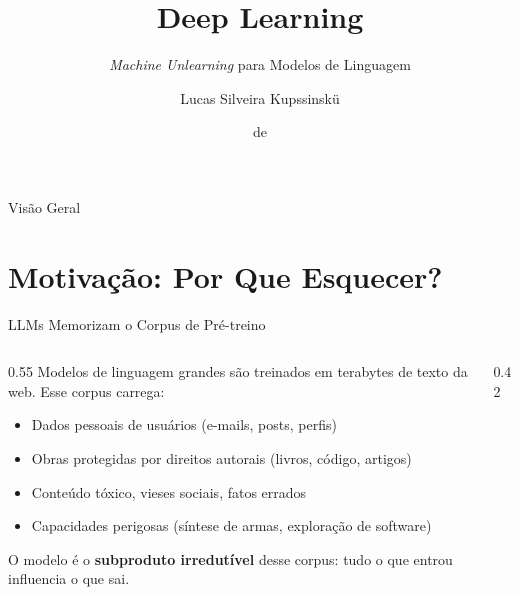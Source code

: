 \documentclass[aspectratio=169,xcolor=dvipsnames]{beamer}
\title{Deep Learning}
\subtitle{\textit{Machine Unlearning} para Modelos de Linguagem}
\author{Lucas Silveira Kupssinskü}
\institute
{
    Machine Learning Theory and Applications Laboratory \\
    PUCRS
}
\date{\mespor de \the\year}
\begin{document}
  \begin{frame}
    \titlepage
  \end{frame}

  \begin{frame}{Visão Geral}
    \tableofcontents
  \end{frame}

  \section{Motivação: Por Que Esquecer?}

  \begin{frame}{LLMs Memorizam o Corpus de Pré-treino}
    \begin{columns}[T]
      \begin{column}{0.55\textwidth}
        Modelos de linguagem grandes são treinados em terabytes de texto da web. Esse corpus carrega:
        \begin{itemize}\setlength{\itemsep}{0.2em}
          \item Dados pessoais de usuários (e-mails, posts, perfis)
          \item Obras protegidas por direitos autorais (livros, código, artigos)
          \item Conteúdo tóxico, vieses sociais, fatos errados
          \item Capacidades perigosas (síntese de armas, exploração de software)
        \end{itemize}

        \vspace{0.4em}
        O modelo é o \textbf{subproduto irredutível} desse corpus: tudo o que entrou influencia o que sai.
      \end{column}
      \begin{column}{0.42\textwidth}
        \centering
      \end{column}
    \end{columns}
  \end{frame}
\end{document}
